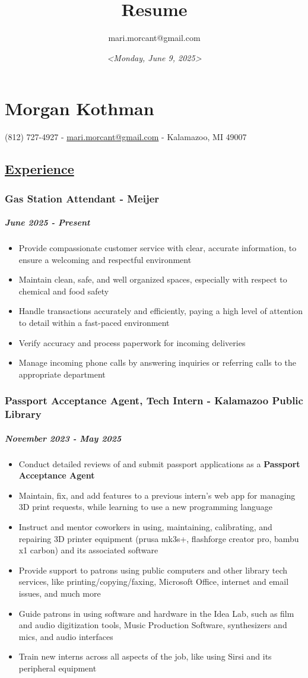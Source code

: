\documentclass[11pt]{article}
\author{mari.morcant@gmail.com}
\date{\textit{<Monday, June  9, 2025>}}
\title{Resume}
\begin{document}
\section*{Morgan Kothman}
\label{sec:org25f398a}
(812) 727-4927 -
\href{mailto:mari.morcant@gmail.com}{mari.morcant@gmail.com} - Kalamazoo, MI 49007
\subsection*{\underline{Experience}}
\label{sec:org0de4a82}
\subsubsection*{Gas Station Attendant - Meijer}
\label{sec:orgfe902f6}
\subparagraph*{\emph{June 2025 - Present}}
\label{sec:orgbc85262}
\begin{itemize}
\item Provide compassionate customer service with clear, accurate
information, to ensure a welcoming and respectful environment
\item Maintain clean, safe, and well organized spaces, especially with
respect to chemical and food safety
\item Handle transactions accurately and efficiently, paying a high level
of attention to detail within a fast-paced environment
\item Verify accuracy and process paperwork for incoming deliveries
\item Manage incoming phone calls by answering inquiries or referring
calls to the appropriate department
\end{itemize}
\subsubsection*{Passport Acceptance Agent, Tech Intern - Kalamazoo Public Library}
\label{sec:orga697191}
\subparagraph*{\emph{November 2023 - May 2025}}
\label{sec:org0590395}
\begin{itemize}
\item Conduct detailed reviews of and submit passport applications as a \textbf{Passport Acceptance Agent}
\item Maintain, fix, and add features to a previous intern's web app for managing 3D print requests, while learning to use a new programming language
\item Instruct and mentor coworkers in using, maintaining, calibrating, and repairing 3D printer equipment (prusa mk3s+, flashforge creator pro, bambu x1 carbon) and its associated software
\item Provide support to patrons using public computers and other library tech services, like printing/copying/faxing, Microsoft Office, internet and email issues, and much more
\item Guide patrons in using software and hardware in the Idea Lab, such as film and audio digitization tools, Music Production Software, synthesizers and mics, and audio interfaces
\item Train new interns across all aspects of the job, like using Sirsi and its peripheral equipment
\end{itemize}
\end{document}
